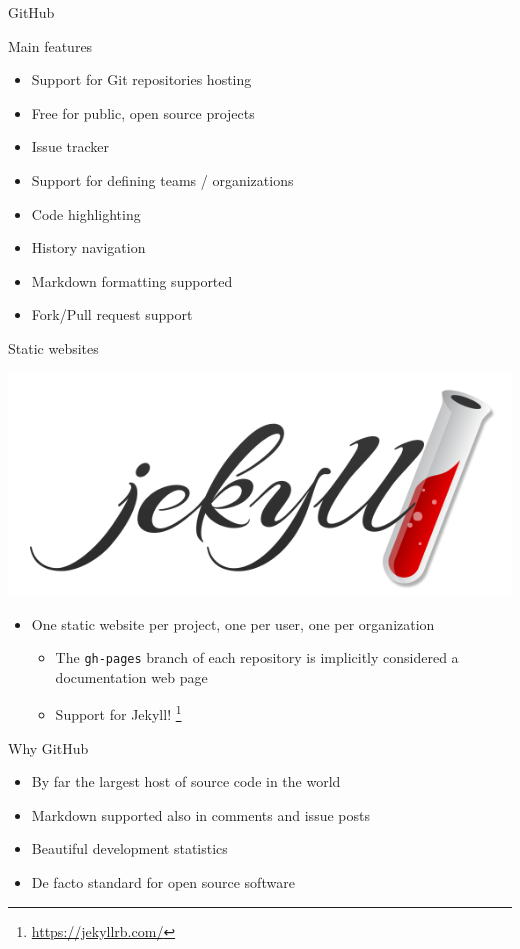 \documentclass[presentation]{beamer}
\begin{document}
\begin{frame}{GitHub}
	\begin{block}{Main features}
		\begin{itemize}
			\item Support for Git repositories hosting
			\item Free for public, open source projects
			\item Issue tracker
			\item Support for defining teams / organizations
			\item Code highlighting
			\item History navigation
			\item Markdown formatting supported
			\item Fork/Pull request support
		\end{itemize}
	\end{block}
	\begin{block}{Static websites}
		\begin{center}
			\includegraphics[height=.2\textheight]{images/jekyll-logo}
		\end{center}
		\begin{itemize}
			\item One static website per project, one per user, one per organization
			\begin{itemize}
				\item The \texttt{gh-pages} branch of each repository is implicitly considered a documentation web page
				\item Support for Jekyll! \footnote{\url{https://jekyllrb.com/}}
			\end{itemize}
		\end{itemize}
	\end{block}
	\begin{block}{Why GitHub}
		\begin{itemize}
			\item By far the largest host of source code in the world
			\item Markdown supported also in comments and issue posts
			\item Beautiful development statistics
			\item De facto standard for open source software
		\end{itemize}
	\end{block}
\end{frame}
\end{document}
